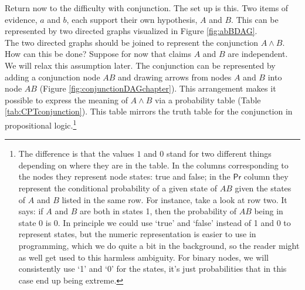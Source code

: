 \documentclass[
  10pt,
  dvipsnames,enabledeprecatedfontcommands]{scrartcl}
\begin{document}
Return now to the difficulty with conjunction. The set up is this. Two
items of evidence, \(a\) and \(b\), each support their own hypothesis,
\(A\) and \(B\). This can be represented by two directed graphs
visualized in Figure \ref{fig:abBDAG}.\\
The two directed graphs should be joined to represent the conjunction
\(A\wedge B\). How can this be done? Suppose for now that claims \(A\)
and \(B\) are independent. We will relax this assumption later. The
conjunction can be represented by adding a conjunction node \(AB\) and
drawing arrows from nodes \(A\) and \(B\) into node \(AB\) (Figure
\ref{fig:conjunctionDAGchapter}). This arrangement makes it possible to
express the meaning of \(A\wedge B\) via a probability table (Table
\ref{tab:CPTconjunction}). This table mirrors the truth table for the
conjunction in propositional logic.\footnote{The difference is that the
  values \(1\) and \(0\) stand for two different things depending on
  where they are in the table. In the columns corresponding to the nodes
  they represent node states: true and false; in the \(\textsf{Pr}\)
  column they represent the conditional probability of a given state of
  \(AB\) given the states of \(A\) and \(B\) listed in the same row. For
  instance, take a look at row two. It says: if \(A\) and \(B\) are both
  in states 1, then the probability of \(AB\) being in state 0 is 0. In
  principle we could use `true' and `false' instead of 1 and 0 to
  represent states, but the numeric representation is easier to use in
  programming, which we do quite a bit in the background, so the reader
  might as well get used to this harmless ambiguity. For binary nodes,
  we will consistently use `1' and `0' for the states, it's just
  probabilities that in this case end up being extreme.}
\end{document}

